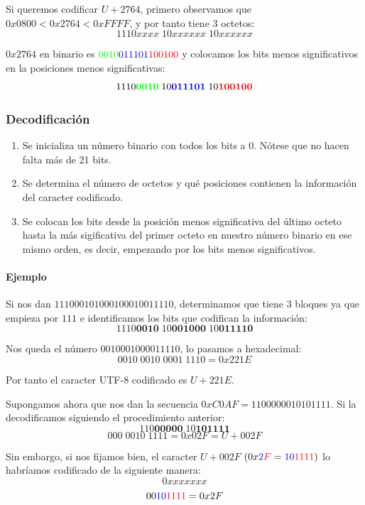 \documentclass{article}
\begin{document}
Si queremos codificar $U+2764$, primero observamos que $0x0800 < 0x2764 <
  0xFFFF$, y por tanto tiene 3 octetos:
\[1110xxxx \; 10xxxxxx \; 10xxxxxx\]

$0x2764$ en binario es ${\color{green}0010} {\color{blue}0111 01}{\color{red}10
      0100}$ y colocamos los bits menos significativos en la posiciones menos
significativas:
\[1110\mathbf{{\color{green}0010}} \; 10\mathbf{{\color{blue}0111 01}} \;
  10\mathbf{{\color{red}10 0100}}\]

\subsubsection{Decodificación}

\begin{enumerate}
  \item Se inicializa un número binario con todos los bits a 0. Nótese que no
        hacen falta más de 21 bits.
  \item Se determina el número de octetos y qué posiciones contienen la
        información del caracter codificado.
  \item Se colocan los bits desde la posición menos significativa del último
        octeto hasta la más sigificativa del primer octeto en nuestro número binario
        en ese mismo orden, es decir, empezando por los bits menos significativos.
\end{enumerate}

\paragraph*{Ejemplo}

Si nos dan $111000101000100010011110$, determinamos que tiene 3 bloques ya que
empieza por $111$ e identificamos los bits que codifican la información:
\[1110\mathbf{0010} \; 10\mathbf{001000} \; 10\mathbf{011110}\]

Nos queda el número $0010001000011110$, lo pasamos a hexadecimal:
\[0010 \; 0010 \; 0001 \; 1110 = 0x221E\]

Por tanto el caracter UTF-8 codificado es $U+221E$.

Supongamos ahora que nos dan la secuencia $0xC0AF = 1100000010101111$. Si la
decodificamos siguiendo el procedimiento anterior:
\[110\mathbf{00000} \; 10\mathbf{101111}\]
\[000 \; 0010 \; 1111 = 0x02F = U+002F\]

Sin embargo, si nos fijamos bien, el caracter $U+002F$
$(0x{\color{blue}2}{\color{red}F} = {\color{blue}10}{\color{red}1111})$ lo
habríamos codificado de la siguiente manera:
\[0xxxxxxx\]
\[00{\color{blue}10}{\color{red}1111} = 0x2F\]
\end{document}
